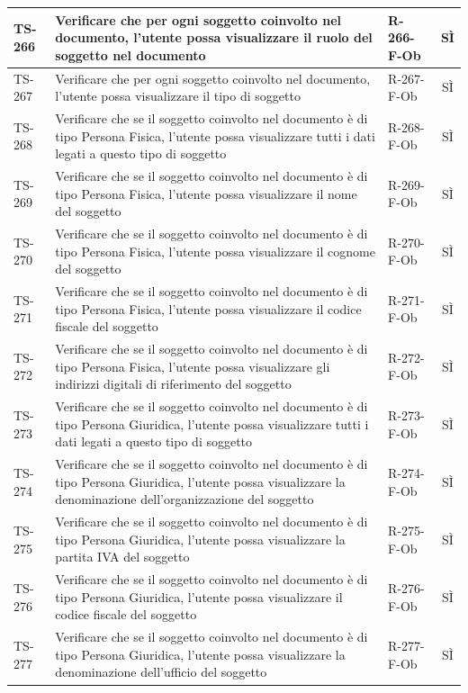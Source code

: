 \documentclass[a4paper,12pt]{article}
\begin{document}
\begin{longtable}{|p{1.5cm}|p{8.3cm}|p{2.4cm}|c|}
\hline
TS-266 & Verificare che per ogni soggetto coinvolto nel documento, l'utente possa visualizzare il ruolo del soggetto nel documento & R-266-F-Ob & SÌ \\
\hline
TS-267 & Verificare che per ogni soggetto coinvolto nel documento, l'utente possa visualizzare il tipo di soggetto & R-267-F-Ob & SÌ \\
\hline
TS-268 & Verificare che se il soggetto coinvolto nel documento è di tipo Persona Fisica, l'utente possa visualizzare tutti i dati legati a questo tipo di soggetto & R-268-F-Ob & SÌ \\
\hline
TS-269 & Verificare che se il soggetto coinvolto nel documento è di tipo Persona Fisica, l'utente possa visualizzare il nome del soggetto & R-269-F-Ob & SÌ \\
\hline
TS-270 & Verificare che se il soggetto coinvolto nel documento è di tipo Persona Fisica, l'utente possa visualizzare il cognome del soggetto & R-270-F-Ob & SÌ \\
\hline
TS-271 & Verificare che se il soggetto coinvolto nel documento è di tipo Persona Fisica, l'utente possa visualizzare il codice fiscale del soggetto & R-271-F-Ob & SÌ \\
\hline
TS-272 & Verificare che se il soggetto coinvolto nel documento è di tipo Persona Fisica, l'utente possa visualizzare gli indirizzi digitali di riferimento del soggetto & R-272-F-Ob & SÌ \\
\hline
TS-273 & Verificare che se il soggetto coinvolto nel documento è di tipo Persona Giuridica, l'utente possa visualizzare tutti i dati legati a questo tipo di soggetto & R-273-F-Ob & SÌ \\
\hline
TS-274 & Verificare che se il soggetto coinvolto nel documento è di tipo Persona Giuridica, l'utente possa visualizzare la denominazione dell'organizzazione del soggetto & R-274-F-Ob & SÌ \\
\hline
TS-275 & Verificare che se il soggetto coinvolto nel documento è di tipo Persona Giuridica, l'utente possa visualizzare la partita IVA del soggetto & R-275-F-Ob & SÌ \\
\hline
TS-276 & Verificare che se il soggetto coinvolto nel documento è di tipo Persona Giuridica, l'utente possa visualizzare il codice fiscale del soggetto & R-276-F-Ob & SÌ \\
\hline
TS-277 & Verificare che se il soggetto coinvolto nel documento è di tipo Persona Giuridica, l'utente possa visualizzare la denominazione dell'ufficio del soggetto & R-277-F-Ob & SÌ \\

\end{longtable}
\end{document}
